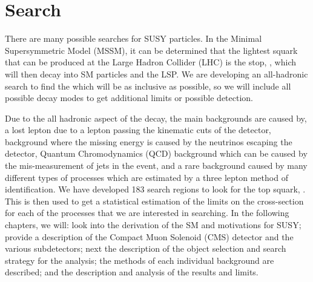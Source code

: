 \section{Search}
\label{sec:search}

There are many possible searches for SUSY particles. In the Minimal Supersymmetric Model (MSSM), it can be determined that the lightest squark that can be produced at the Large Hadron Collider (LHC) is the stop, \st{}, which will then decay into SM particles and the LSP.  We are developing an all-hadronic search to find the \st{} which will be as inclusive as possible, so we will include all possible decay modes to get additional limits or possible detection. 

Due to the all hadronic aspect of the decay, the main backgrounds are caused by, a lost lepton due to a lepton passing the kinematic cuts of the detector, \Znunu{} background where the missing energy is caused by the neutrinos escaping the detector, Quantum Chromodynamics (QCD) background which can be caused by the mis-measurement of jets in the event, and a rare background caused by many different types of processes which are estimated by a three lepton method of identification. We have developed 183 search regions to look for the top squark, \st{}. This is then used to get a statistical estimation of the limits on the cross-section for each of the processes that we are interested in searching. In the following chapters, we will: look into the derivation of the SM and motivations for SUSY; provide a description of the Compact Muon Solenoid (CMS) detector and the various subdetectors; next the description of the object selection and search strategy for the analysis; the methods of each individual background are described; and the description and analysis of the results and limits. 

